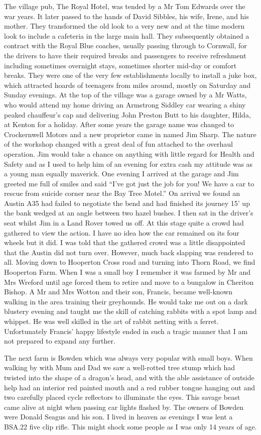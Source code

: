 The village pub, The Royal Hotel, was tended by a Mr Tom Edwards over the war
years. It later passed to the hands of David Sibbles, his wife, Irene, and his
mother. They transformed the old look to a very new and at the time modern look
to include a cafeteria in the large main hall. They subsequently obtained a
contract with the Royal Blue coaches, usually passing through to Cornwall, for
the drivers to have their required breaks and passengers to receive refreshment
including sometimes overnight stays, sometimes shorter mid-day or comfort
breaks. They were one of the very few establishments locally to install a juke
box, which attracted hoards of teenagers from miles around, mostly on Saturday
and Sunday evenings. At the top of the village was a garage owned by a Mr
Watts, who would attend my home driving an Armstrong Siddley car wearing a
shiny peaked chauffeur's cap and delivering John Preston Butt to his daughter,
Hilda, at Kenton for a holiday. After some years the garage name was changed to
Crockernwell Motors and a new proprietor came in named Jim Sharp. The nature of
the workshop changed with a great deal of fun attached to the overhaul
operation. Jim would take a chance on anything with little regard for Health
and Safety and as I used to help him of an evening for extra cash my attitude
was as a young man equally maverick. One evening I arrived at the garage and
Jim greeted me full of smiles and said ``I've got just the job for you!  We
have a car to rescue from suicide corner near the Bay Tree Motel.''  On arrival
we found an Austin A35 had failed to negotiate the bend and had finished its
journey 15' up the bank wedged at an angle between two hazel bushes. I then sat
in the driver's seat whilst Jim in a Land Rover towed us off. At this stage
quite a crowd had gathered to view the action. I have no idea how the car
remained on its four wheels but it did. I was told that the gathered crowd was
a little disappointed that the Austin did not turn over. However, much back
slapping was rendered to all. Moving down to Hooperton Cross road and turning
into Thorn Road, we find Hooperton Farm. When I was a small boy I remember it
was farmed by Mr and Mrs Wreford until age forced them to retire and move to a
bungalow in Cheriton Bishop. A Mr and Mrs Wotton and their son, Francis, became
well-known walking in the area training their greyhounds. He would take me out
on a dark blustery evening and taught me the skill of catching rabbits with a
spot lamp and whippet. He was well skilled in the art of rabbit netting with a
ferret. Unfortunately Francis' happy lifestyle ended in such a tragic manner
that I am not prepared to expand any further.

The next farm is Bowden which was always very popular with small boys. When
walking by with Mum and Dad we saw a well-rotted tree stump which had twisted
into the shape of a dragon's head, and with the able assistance of outside help
had an interior red painted mouth and a red rubber tongue hanging out and two
carefully placed cycle reflectors to illuminate the eyes. This savage beast
came alive at night when passing car lights flashed by. The owners of Bowden
were Donald Seagus and his son. I lived in heaven as evenings I was lent a
BSA.22 five clip rifle. This might shock some people as I was only 14 years of
age.
